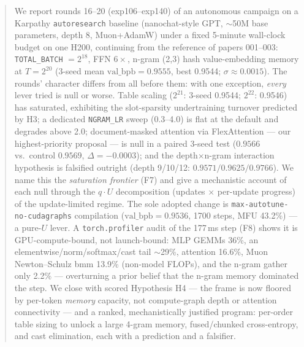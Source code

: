 \documentclass{article}
\newcommand{\valbpb}{\mathrm{val\_bpb}}
\begin{document}

\printAffiliationsAndNotice{}

\begin{abstract}
We report rounds 16--20 (exp106--exp140) of an autonomous campaign on a Karpathy \texttt{autoresearch} baseline (nanochat-style GPT, $\sim$50M base parameters, depth 8, Muon+AdamW) under a fixed 5-minute wall-clock budget on one H200, continuing from the reference of papers 001--003: \texttt{TOTAL\_BATCH} $=2^{18}$, FFN $6\times$, n-gram (2,3) hash value-embedding memory at $T = 2^{20}$ (3-seed mean $\valbpb = 0.9555$, best 0.9544; $\sigma \approx 0.0015$). The rounds' character differs from all before them: with one exception, \emph{every} lever tried is null or worse. Table scaling ($2^{21}$: 3-seed 0.9544; $2^{22}$: 0.9546) has saturated, exhibiting the slot-sparsity undertraining turnover predicted by H3; a dedicated \texttt{NGRAM\_LR} sweep (0.3--4.0) is flat at the default and degrades above 2.0; document-masked attention via FlexAttention --- our highest-priority proposal --- is null in a paired 3-seed test ($0.9566$ vs.\ control $0.9569$, $\Delta = -0.0003$); and the depth$\times$n-gram interaction hypothesis is falsified outright (depth 9/10/12: $0.9571/0.9625/0.9766$). We name this the \emph{saturation frontier} (F7) and give a mechanistic account of each null through the $q \cdot U$ decomposition (updates $\times$ per-update progress) of the update-limited regime. The sole adopted change is \texttt{max-autotune-no-cudagraphs} compilation ($\valbpb = 0.9536$, 1700 steps, MFU 43.2\%) --- a pure-$U$ lever. A \texttt{torch.profiler} audit of the 177\,ms step (F8) shows it is GPU-compute-bound, not launch-bound: MLP GEMMs 36\%, an elementwise/norm/softmax/cast tail $\sim$29\%, attention 16.6\%, Muon Newton--Schulz bmm 13.9\% (non-model FLOPs), and the n-gram gather only 2.2\% --- overturning a prior belief that the n-gram memory dominated the step. We close with scored Hypothesis H4 --- the frame is now floored by per-token \emph{memory} capacity, not compute-graph depth or attention connectivity --- and a ranked, mechanistically justified program: per-order table sizing to unlock a large 4-gram memory, fused/chunked cross-entropy, and cast elimination, each with a prediction and a falsifier.
\end{abstract}
\end{document}
